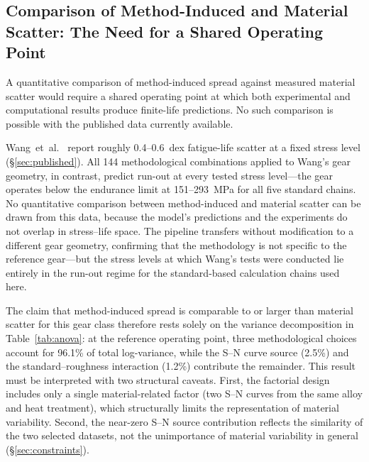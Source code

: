 \documentclass[twocolumn,12pt,a4paper]{article}
\begin{document}
\subsection{Comparison of Method-Induced and Material Scatter: The Need for a Shared Operating Point}
\label{sec:method_dominates}

A quantitative comparison of method-induced spread against measured
material scatter would require a shared operating point at which both
experimental and computational results produce finite-life predictions.
No such comparison is possible with the published data currently
available.

Wang~et~al.~\cite{wang2023} report roughly 0.4--0.6~dex
fatigue-life scatter at a fixed stress level
(\S\ref{sec:published}). All 144 methodological combinations applied
to Wang's gear geometry, in contrast, predict
run-out at every tested stress level---the gear operates below the
endurance limit at 151--293~MPa for all five standard chains. No
quantitative comparison between method-induced and material scatter
can be drawn from this data, because the model's predictions and the
experiments do not overlap in stress--life space. The pipeline
transfers without modification to a different gear geometry, confirming
that the methodology is not specific to the reference gear---but the
stress levels at which Wang's tests were conducted lie entirely in the
run-out regime for the standard-based calculation chains used here.

The claim that method-induced spread is comparable to or larger than
material scatter for this gear class therefore rests solely on the
variance decomposition in Table~\ref{tab:anova}: at the reference
operating point, three methodological choices account for 96.1\% of
total log-variance, while the S--N curve source (2.5\%) and the
standard--roughness interaction (1.2\%) contribute the remainder. This result must be interpreted with two structural
caveats. First, the factorial design includes only a single
material-related factor (two S--N curves from the same alloy and heat
treatment), which structurally limits the representation of material
variability. Second, the near-zero S--N source contribution reflects
the similarity of the two selected datasets, not the unimportance of
material variability in general (\S\ref{sec:constraints}).
\end{document}
